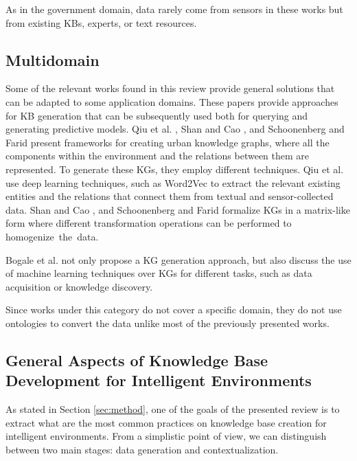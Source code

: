 
As in the government domain, data rarely come from sensors in these works but from existing KBs, experts, or text resources.
 
 
\subsection{Multidomain}
Some of the relevant works found in this review provide general solutions that can be adapted to some application domains. These papers provide approaches for KB generation that can be subsequently used both for querying and generating predictive models. Qiu et al. \citep{qiuetal}, Shan and Cao \citep{shanandcao}, and Schoonenberg and Farid \citep{schoonenbergandfarid} present frameworks for creating urban knowledge graphs, where all the components within the environment and the relations between them are represented. To generate these KGs, they employ different techniques. Qiu et al. \citep{qiuetal} use deep learning techniques, such as Word2Vec \citep{Mikolov:2013:DRW:2999792.2999959} to extract the relevant existing entities and the relations that connect them from textual and sensor-collected data. Shan and Cao \citep{shanandcao}, and Schoonenberg and Farid \citep{schoonenbergandfarid} formalize KGs in a matrix-like form where different transformation operations can be performed to homogenize~the~data. 

Bogale et al. \citep{bogaleetal} not only propose a KG generation approach, but also discuss the use of machine learning techniques over KGs for different tasks, such as data acquisition or knowledge discovery. 

Since works under this category do not cover a specific domain, they do not use ontologies to convert the data unlike most of the previously presented works.

\subsection{General Aspects of Knowledge Base Development for Intelligent Environments}

As stated in Section \ref{sec:method}, one of the goals of the presented review is to extract what are the most common practices on knowledge base creation for intelligent environments. From a simplistic point of view, we can distinguish between two main stages: data generation and contextualization. 



